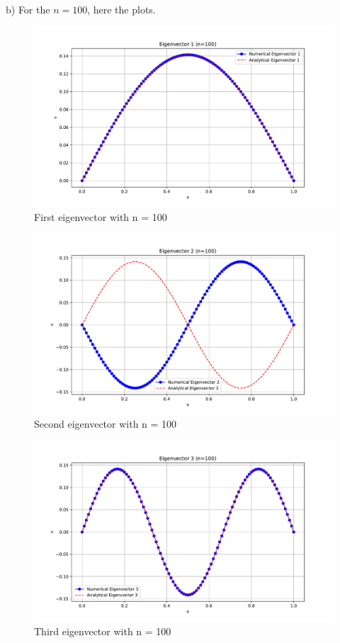 \documentclass[english,notitlepage]{revtex4-1}
\begin{document}
\subsection*{}
b) For the $n = 100$, here the plots.

\begin{figure} [H]
    \centering
    \includegraphics[width=0.75\linewidth]{problem6/eigenvector1_n100.pdf}
    \caption{First eigenvector with n = 100}
    \label{fig:enter-label}
\end{figure}
\begin{figure} [H]
    \centering
    \includegraphics[width=0.75\linewidth]{problem6/eigenvector2_n100.pdf}
    \caption{Second eigenvector with n = 100}
    \label{fig:enter-label}
\end{figure}
\begin{figure}
    \centering
    \includegraphics[width=0.75\linewidth]{problem6/eigenvector3_n100.pdf}
    \caption{Third eigenvector with n = 100}
    \label{fig:enter-label}
\end{figure}
\end{document}
